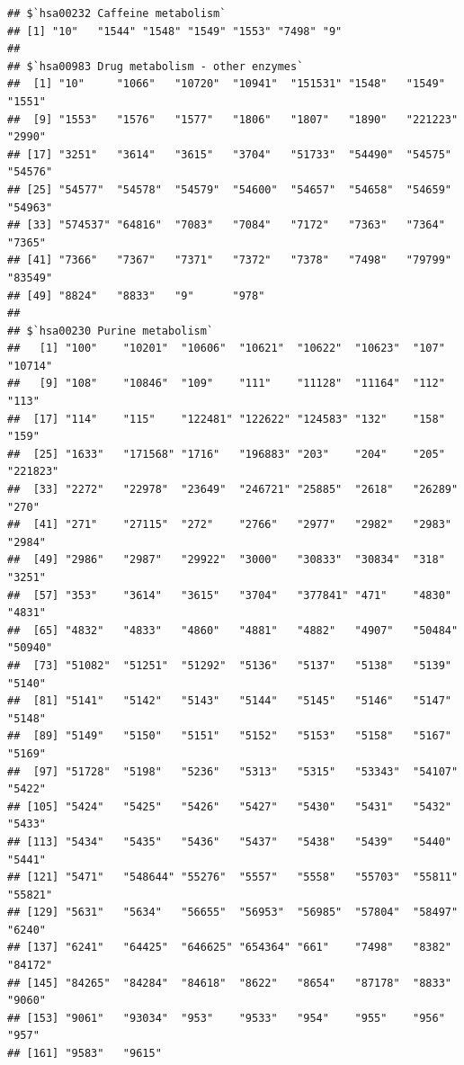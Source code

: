 \documentclass[
]{article}
\newenvironment{Shaded}{\begin{snugshade}}{\end{snugshade}}
\newcommand{\FunctionTok}[1]{\textcolor[rgb]{0.13,0.29,0.53}{\textbf{#1}}}
\newcommand{\NormalTok}[1]{#1}
\newcommand{\OtherTok}[1]{\textcolor[rgb]{0.56,0.35,0.01}{#1}}
\newcommand{\SpecialCharTok}[1]{\textcolor[rgb]{0.81,0.36,0.00}{\textbf{#1}}}
\begin{document}
\begin{verbatim}
## $`hsa00232 Caffeine metabolism`
## [1] "10"   "1544" "1548" "1549" "1553" "7498" "9"   
## 
## $`hsa00983 Drug metabolism - other enzymes`
##  [1] "10"     "1066"   "10720"  "10941"  "151531" "1548"   "1549"   "1551"  
##  [9] "1553"   "1576"   "1577"   "1806"   "1807"   "1890"   "221223" "2990"  
## [17] "3251"   "3614"   "3615"   "3704"   "51733"  "54490"  "54575"  "54576" 
## [25] "54577"  "54578"  "54579"  "54600"  "54657"  "54658"  "54659"  "54963" 
## [33] "574537" "64816"  "7083"   "7084"   "7172"   "7363"   "7364"   "7365"  
## [41] "7366"   "7367"   "7371"   "7372"   "7378"   "7498"   "79799"  "83549" 
## [49] "8824"   "8833"   "9"      "978"   
## 
## $`hsa00230 Purine metabolism`
##   [1] "100"    "10201"  "10606"  "10621"  "10622"  "10623"  "107"    "10714" 
##   [9] "108"    "10846"  "109"    "111"    "11128"  "11164"  "112"    "113"   
##  [17] "114"    "115"    "122481" "122622" "124583" "132"    "158"    "159"   
##  [25] "1633"   "171568" "1716"   "196883" "203"    "204"    "205"    "221823"
##  [33] "2272"   "22978"  "23649"  "246721" "25885"  "2618"   "26289"  "270"   
##  [41] "271"    "27115"  "272"    "2766"   "2977"   "2982"   "2983"   "2984"  
##  [49] "2986"   "2987"   "29922"  "3000"   "30833"  "30834"  "318"    "3251"  
##  [57] "353"    "3614"   "3615"   "3704"   "377841" "471"    "4830"   "4831"  
##  [65] "4832"   "4833"   "4860"   "4881"   "4882"   "4907"   "50484"  "50940" 
##  [73] "51082"  "51251"  "51292"  "5136"   "5137"   "5138"   "5139"   "5140"  
##  [81] "5141"   "5142"   "5143"   "5144"   "5145"   "5146"   "5147"   "5148"  
##  [89] "5149"   "5150"   "5151"   "5152"   "5153"   "5158"   "5167"   "5169"  
##  [97] "51728"  "5198"   "5236"   "5313"   "5315"   "53343"  "54107"  "5422"  
## [105] "5424"   "5425"   "5426"   "5427"   "5430"   "5431"   "5432"   "5433"  
## [113] "5434"   "5435"   "5436"   "5437"   "5438"   "5439"   "5440"   "5441"  
## [121] "5471"   "548644" "55276"  "5557"   "5558"   "55703"  "55811"  "55821" 
## [129] "5631"   "5634"   "56655"  "56953"  "56985"  "57804"  "58497"  "6240"  
## [137] "6241"   "64425"  "646625" "654364" "661"    "7498"   "8382"   "84172" 
## [145] "84265"  "84284"  "84618"  "8622"   "8654"   "87178"  "8833"   "9060"  
## [153] "9061"   "93034"  "953"    "9533"   "954"    "955"    "956"    "957"   
## [161] "9583"   "9615"
\end{verbatim}

\begin{Shaded}
\end{Shaded}
\end{document}
